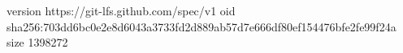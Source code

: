 version https://git-lfs.github.com/spec/v1
oid sha256:703dd6bc0e2e8d6043a3733fd2d889ab57d7e666df80ef154476bfe2fe99f24a
size 1398272
